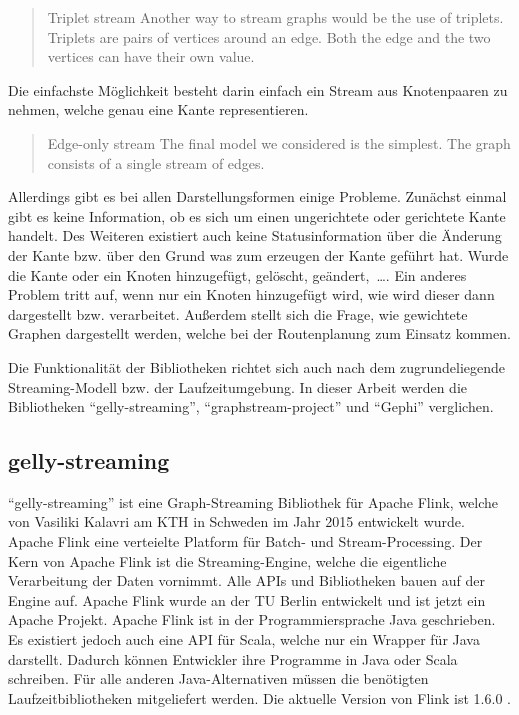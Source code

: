 \foreignblockquote{english}[\cite{Bali2015}]{
Triplet stream Another way to stream graphs would be the use of triplets.
Triplets are pairs of vertices around an edge. Both the edge and the two vertices
can have their own value.
}

Die einfachste Möglichkeit besteht darin einfach ein Stream aus Knotenpaaren zu
nehmen, welche genau eine Kante representieren.

\foreignblockquote{english}[\cite{Bali2015}]{
Edge-only stream The final model we considered is the simplest. The graph
consists of a single stream of edges.
}

Allerdings gibt es bei allen Darstellungsformen einige Probleme. Zunächst einmal
gibt es keine Information, ob es sich um einen ungerichtete oder gerichtete
Kante handelt. Des Weiteren existiert auch keine Statusinformation über die
Änderung der Kante bzw. über den Grund was zum erzeugen der Kante geführt hat.
Wurde die Kante oder ein Knoten hinzugefügt, gelöscht, geändert,~\dots . Ein
anderes Problem tritt auf, wenn nur ein Knoten hinzugefügt wird, wie wird dieser
dann dargestellt bzw. verarbeitet. Außerdem stellt sich die Frage, wie gewichtete
Graphen dargestellt werden, welche bei der Routenplanung zum Einsatz kommen.


Die Funktionalität der Bibliotheken richtet sich auch nach dem zugrundeliegende
Streaming-Modell bzw. der Laufzeitumgebung. In dieser Arbeit werden die
Bibliotheken \enquote{gelly-streaming}, \enquote{graphstream-project} und
\enquote{Gephi} verglichen.

\subsection{gelly-streaming}
\enquote{gelly-streaming} ist eine Graph-Streaming Bibliothek für Apache Flink,
welche von Vasiliki Kalavri am KTH in Schweden im Jahr 2015 entwickelt wurde.
Apache Flink eine verteielte Platform für Batch- und Stream-Processing. Der Kern
von Apache Flink ist die Streaming-Engine, welche die eigentliche Verarbeitung
der Daten vornimmt. Alle \glspl{API} und Bibliotheken bauen auf der Engine auf.
Apache Flink wurde an der TU Berlin entwickelt und ist jetzt ein Apache Projekt.
Apache Flink ist in der Programmiersprache Java geschrieben. Es existiert jedoch
auch eine \gls{API} für Scala, welche nur ein Wrapper für Java darstellt. Dadurch
können Entwickler ihre Programme in Java oder Scala schreiben. Für alle anderen
Java-Alternativen müssen die benötigten Laufzeitbibliotheken mitgeliefert
werden. Die aktuelle Version von Flink ist 1.6.0 .

